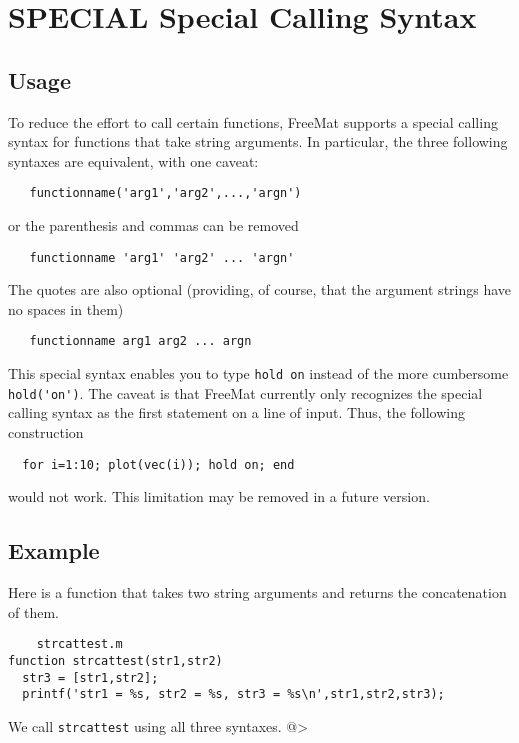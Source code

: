 \section{SPECIAL Special Calling Syntax}

\subsection{Usage}

To reduce the effort to call certain functions, FreeMat supports
a special calling syntax for functions that take string arguments.
In particular, the three following syntaxes are equivalent, with
one caveat:
\begin{verbatim}
   functionname('arg1','arg2',...,'argn')
\end{verbatim}
or the parenthesis and commas can be removed
\begin{verbatim}
   functionname 'arg1' 'arg2' ... 'argn'
\end{verbatim}
The quotes are also optional (providing, of course, that the
argument strings have no spaces in them)
\begin{verbatim}
   functionname arg1 arg2 ... argn
\end{verbatim}
This special syntax enables you to type \verb|hold on| instead of
the more cumbersome \verb|hold('on')|.  The caveat is that FreeMat
currently only recognizes the special calling syntax as the
first statement on a line of input.  Thus, the following construction
\begin{verbatim}
  for i=1:10; plot(vec(i)); hold on; end
\end{verbatim}
would not work.  This limitation may be removed in a future
version.
\subsection{Example}

Here is a function that takes two string arguments and
returns the concatenation of them.
\begin{verbatim}
    strcattest.m
function strcattest(str1,str2)
  str3 = [str1,str2];
  printf('str1 = %s, str2 = %s, str3 = %s\n',str1,str2,str3);
\end{verbatim}
We call \verb|strcattest| using all three syntaxes.
@>
